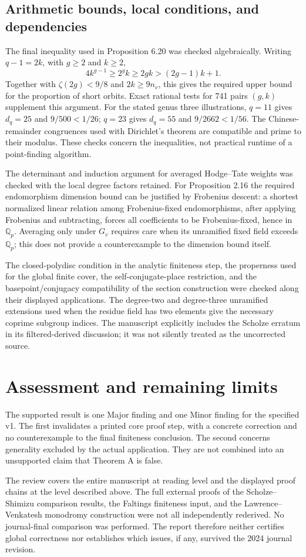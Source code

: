 \documentclass[10pt]{article}
\begin{document}
\subsection*{Arithmetic bounds, local conditions, and dependencies}
The final inequality used in Proposition 6.20 was checked algebraically. Writing \(q-1=2k\), with \(g\geq2\) and \(k\geq2\), \[4k^{g-1}\geq 2^g k\geq2gk>(2g-1)k+1.\] Together with \(\zeta(2g)<9/8\) and \(2k\geq9n_v\), this gives the required upper bound for the proportion of short orbits. Exact rational tests for 741 pairs \((g,k)\) supplement this argument. For the stated genus three illustrations, \(q=11\) gives \(d_q=25\) and \(9/500<1/26\); \(q=23\) gives \(d_q=55\) and \(9/2662<1/56\). The Chinese-remainder congruences used with Dirichlet’s theorem are compatible and prime to their modulus. These checks concern the inequalities, not practical runtime of a point-finding algorithm.\par
The determinant and induction argument for averaged Hodge–Tate weights was checked with the local degree factors retained. For Proposition 2.16 the required endomorphism dimension bound can be justified by Frobenius descent: a shortest normalized linear relation among Frobenius-fixed endomorphisms, after applying Frobenius and subtracting, forces all coefficients to be Frobenius-fixed, hence in \(\mathbb Q_p\). Averaging only under \(G_v\) requires care when its unramified fixed field exceeds \(\mathbb Q_p\); this does not provide a counterexample to the dimension bound itself.\par
The closed-polydisc condition in the analytic finiteness step, the properness used for the global finite cover, the self-conjugate-place restriction, and the basepoint/conjugacy compatibility of the section construction were checked along their displayed applications. The degree-two and degree-three unramified extensions used when the residue field has two elements give the necessary coprime subgroup indices. The manuscript explicitly includes the Scholze erratum in its filtered-derived discussion; it was not silently treated as the uncorrected source.\par
\section*{Assessment and remaining limits}
The supported result is one Major finding and one Minor finding for the specified v1. The first invalidates a printed core proof step, with a concrete correction and no counterexample to the final finiteness conclusion. The second concerns generality excluded by the actual application. They are not combined into an unsupported claim that Theorem A is false.\par
The review covers the entire manuscript at reading level and the displayed proof chains at the level described above. The full external proofs of the Scholze–Shimizu comparison results, the Faltings finiteness input, and the Lawrence–Venkatesh monodromy construction were not all independently rederived. No journal-final comparison was performed. The report therefore neither certifies global correctness nor establishes which issues, if any, survived the 2024 journal revision.\par
\end{document}
